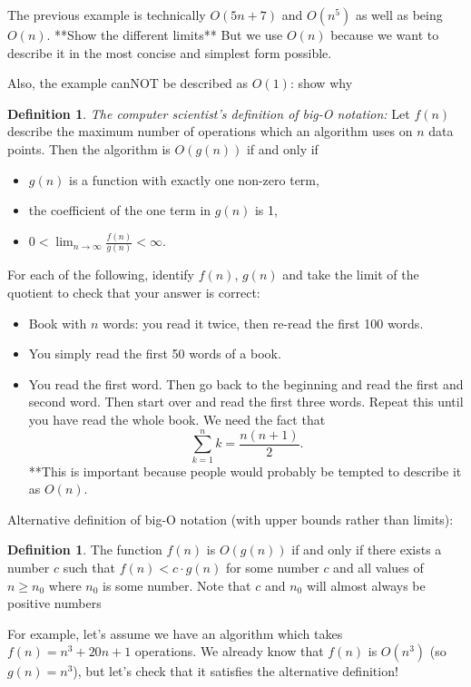 \documentclass{article}
\theoremstyle{definition}
\newtheorem{definition}[thm]{Definition}
\numberwithin{equation}{section}
\begin{document}
The previous example is technically $O(5n+7)$ and $O(n^5)$ as well as being $O(n)$. **Show the different limits** But we use $O(n)$ because we want to describe it in the most concise and simplest form possible.

Also, the example canNOT be described as $O(1)$: show why

\begin{definition}{\em The computer scientist's definition of big-O notation:} Let $f(n)$ describe the maximum number of operations which an algorithm uses on $n$ data points. Then the algorithm is $O(g(n))$ if and only if
\begin{itemize}
\item $g(n)$ is a function with exactly one non-zero term,
\item the coefficient of the one term in $g(n)$ is 1,
\item $0<\lim_{n\to\infty}\frac{f(n)}{g(n)}<\infty$.
\end{itemize}
\end{definition}


For each of the following, identify $f(n)$, $g(n)$ and take the limit of the quotient to check that your answer is correct:
\begin{itemize}
\item Book with $n$ words: you read it twice, then re-read the first 100 words.
\item You simply read the first 50 words of a book.
\item You read the first word. Then go back to the beginning and read the first and second word. Then start over and read the first three words. Repeat this until you have read the whole book. We need the fact that
\[\sum_{k=1}^nk=\frac{n(n+1)}{2}.\]
**This is important because people would probably be tempted to describe it as $O(n)$.
\end{itemize}


Alternative definition of big-O notation (with upper bounds rather than limits):
\begin{definition} The function $f(n)$ is $O(g(n))$ if and only if there exists a number $c$ such that $f(n)<c\cdot g(n)$ for some number $c$ and all values of $n\geq n_0$ where $n_0$ is some number.\newline
Note that $c$ and $n_0$ will almost always be positive numbers
\end{definition}

For example, let's assume we have an algorithm which takes $f(n)=n^3+20n+1$ operations. We already know that $f(n)$ is $O(n^3)$ (so $g(n)=n^3$), but let's check that it satisfies the alternative definition!
\end{document}
